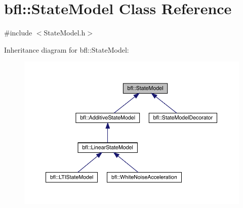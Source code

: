 \hypertarget{classbfl_1_1StateModel}{}\section{bfl\+:\+:State\+Model Class Reference}
\label{classbfl_1_1StateModel}


{\ttfamily \#include $<$State\+Model.\+h$>$}



Inheritance diagram for bfl\+:\+:State\+Model\+:
\nopagebreak
\begin{figure}[H]
\begin{center}
\leavevmode
\includegraphics[width=350pt]{classbfl_1_1StateModel__inherit__graph}
\end{center}
\end{figure}
